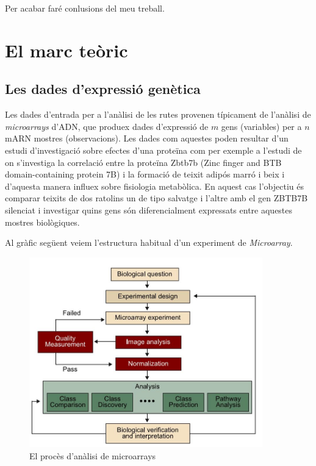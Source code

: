 Per acabar faré conlusions del meu treball.
 
\chapter{El marc teòric}

\section{Les dades d'expressió genètica}
Les dades d'entrada per a l'anàlisi de les rutes provenen típicament de l'anàlisi de \textit{microarrays} d'ADN, que produex dades d'expressió de $m$ gens (variables) per a $n$ mARN mostres (observacions). Les dades com aquestes poden resultar d'un estudi d'investigació sobre efectes d'una proteïna com per exemple a l'estudi de \cite{li2017zbtb7b} on s'investiga la correlació entre la proteïna Zbtb7b (Zinc finger and BTB domain-containing protein 7B) i la formació de teixit adipós marró i beix i d'aquesta manera influex sobre fisiologia metabòlica. En aquest cas l'objectiu és comparar teixits de dos ratolins un de tipo salvatge i l'altre amb el gen ZBTB7B silenciat i investigar quins gens són diferencialment expressats entre aquestes mostres biològiques. 

Al gràfic següent veiem l'estructura habitual d'un experiment de \textit{Microarray}.

\begin{figure}[H]
\centering
\includegraphics[width=0.9\textwidth]{figures/Pipeline_Microarray.jpg} 
\caption{El procès d'anàlisi de microarrays}
\end{figure}

